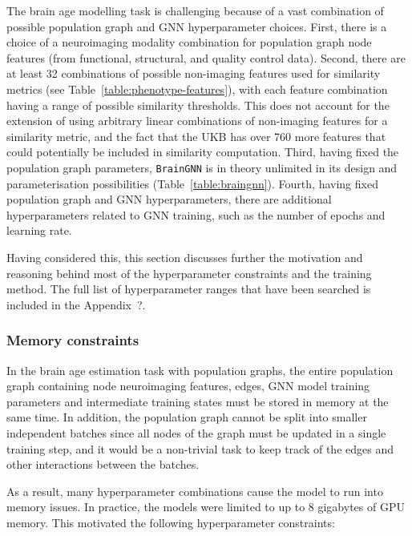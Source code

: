 The brain age modelling task is challenging because of a vast combination of possible population graph and GNN hyperparameter choices. First, there is a choice of a neuroimaging modality combination for population graph node features (from functional, structural, and quality control data). Second, there are at least 32 combinations of possible non-imaging features used for similarity metrics (see Table~\ref{table:phenotype-features}), with each feature combination having a range of possible similarity thresholds. This does not account for the extension of using arbitrary linear combinations of non-imaging features for a similarity metric, and the fact that the UKB has over 760 more features that could potentially be included in similarity computation. Third, having fixed the population graph parameters, \texttt{BrainGNN} is in theory unlimited in its design and parameterisation possibilities (Table~\ref{table:braingnn}). Fourth, having fixed population graph and GNN hyperparameters, there are additional hyperparameters related to GNN training, such as the number of epochs and learning rate.

Having considered this, this section discusses further the motivation and reasoning behind most of the hyperparameter constraints and the training method. The full list of hyperparameter ranges that have been searched is included in the Appendix~?. 

\subsubsection{Memory constraints}
\label{section:memory}
In the brain age estimation task with population graphs, the entire population graph containing node neuroimaging features, edges, GNN model training parameters and intermediate training states must be stored in memory at the same time. In addition, the population graph cannot be split into smaller independent batches since all nodes of the graph must be updated in a single training step, and it would be a non-trivial task to keep track of the edges and other interactions between the batches.

As a result, many hyperparameter combinations cause the model to run into memory issues. In practice, the models were limited to up to 8 gigabytes of GPU memory. This motivated the following hyperparameter constraints:

